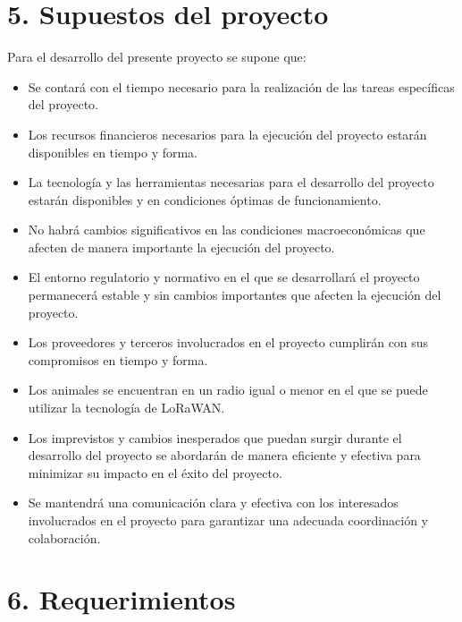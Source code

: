 \documentclass[
11pt, %
]{charter}
\begin{document}
\section{5. Supuestos del proyecto}
\label{sec:supuestos}

Para el desarrollo del presente proyecto se supone que:

\begin{itemize}
	\item Se contará con el tiempo necesario para la realización de las tareas específicas del proyecto.
	\item Los recursos financieros necesarios para la ejecución del proyecto estarán disponibles en tiempo y forma.
	\item La tecnología y las herramientas necesarias para el desarrollo del proyecto estarán disponibles y en condiciones óptimas de funcionamiento.
	\item No habrá cambios significativos en las condiciones macroeconómicas que afecten de manera importante la ejecución del proyecto.
	\item El entorno regulatorio y normativo en el que se desarrollará el proyecto permanecerá estable y sin cambios importantes que afecten la ejecución del proyecto.
	\item Los proveedores y terceros involucrados en el proyecto cumplirán con sus compromisos en tiempo y forma.
	\item Los animales se encuentran en un radio igual o menor en el que se puede utilizar la tecnología de LoRaWAN. 
	\item Los imprevistos y cambios inesperados que puedan surgir durante el desarrollo del proyecto se abordarán de manera eficiente y efectiva para minimizar su impacto en el éxito del proyecto.
	\item Se mantendrá una comunicación clara y efectiva con los interesados involucrados en el proyecto para garantizar una adecuada coordinación y colaboración.
\end{itemize}

\vspace*{\fill}
\pagebreak

\section{6. Requerimientos}
\label{sec:requerimientos}
\end{document}
